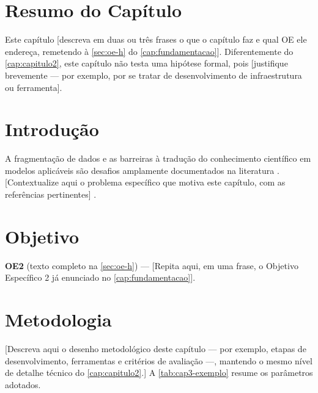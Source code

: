 %
%

\section{Resumo do Capítulo}
\label{sec:cap3-resumo}

Este capítulo [descreva em duas ou três frases o que o capítulo faz e
qual OE ele endereça, remetendo à \autoref{sec:oe-h} do
\autoref{cap:fundamentacao}]. Diferentemente do
\autoref{cap:capitulo2}, este capítulo não testa uma hipótese formal,
pois [justifique brevemente — por exemplo, por se tratar de
desenvolvimento de infraestrutura ou ferramenta].

\section{Introdução}
\label{sec:cap3-introducao}

A fragmentação de dados e as barreiras à tradução do conhecimento
científico em modelos aplicáveis são desafios amplamente documentados
na literatura \cite{exemplo:capitulo:2019}. [Contextualize aqui o
problema específico que motiva este capítulo, com as referências
pertinentes] \cite{exemplo:dissertacao:2022}.

\section{Objetivo}
\label{sec:cap3-objetivo}

\textbf{OE2} (texto completo na \autoref{sec:oe-h}) — [Repita aqui,
em uma frase, o Objetivo Específico 2 já enunciado no
\autoref{cap:fundamentacao}].

\section{Metodologia}
\label{sec:cap3-metodologia}

[Descreva aqui o desenho metodológico deste capítulo — por exemplo,
etapas de desenvolvimento, ferramentas e critérios de avaliação —,
mantendo o mesmo nível de detalhe técnico do
\autoref{cap:capitulo2}.] A \autoref{tab:cap3-exemplo} resume os
parâmetros adotados.

